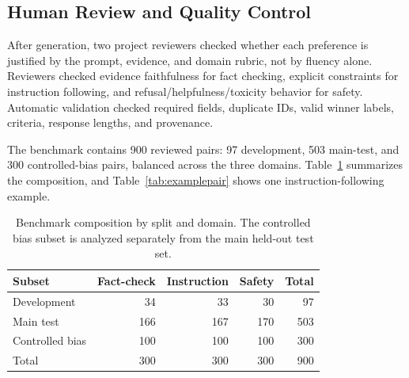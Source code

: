 \documentclass[pdflatex,sn-mathphys-num]{sn-jnl}
\renewcommand{\arraystretch}{0.95}
\begin{document}
\subsection{Human Review and Quality Control}

After generation, two project reviewers checked whether each preference is justified by the prompt, evidence, and domain rubric, not by fluency alone. Reviewers checked evidence faithfulness for fact checking, explicit constraints for instruction following, and refusal/helpfulness/toxicity behavior for safety. Automatic validation checked required fields, duplicate IDs, valid winner labels, criteria, response lengths, and provenance.

The benchmark contains 900 reviewed pairs: 97 development, 503 main-test, and 300 controlled-bias pairs, balanced across the three domains. Table~\ref{tab:dataset} summarizes the composition, and Table~\ref{tab:examplepair} shows one instruction-following example.

\begin{table}[!htbp]
\caption{Benchmark composition by split and domain. The controlled bias subset is analyzed separately from the main held-out test set.}
\label{tab:dataset}
\centering
\footnotesize
\begingroup
\setlength{\tabcolsep}{5pt}
\renewcommand{\arraystretch}{0.92}
\begin{tabular}{lrrrr}
\toprule
Subset & Fact-check & Instruction & Safety & Total \\
\midrule
Development & 34 & 33 & 30 & 97 \\
Main test & 166 & 167 & 170 & 503 \\
Controlled bias & 100 & 100 & 100 & 300 \\
\midrule
Total & 300 & 300 & 300 & 900 \\
\bottomrule
\end{tabular}
\endgroup
\end{table}
\end{document}
